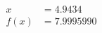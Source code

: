 \documentclass[preview]{standalone}
\begin{document}
\begin{align*}
x &= 4.9434\\f(x) &= 7.9995990
\end{align*}
\end{document}
